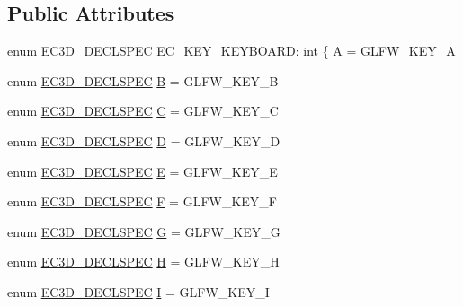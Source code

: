 \subsection*{Public Attributes}
\begin{DoxyCompactItemize}
\item 
enum \mbox{\hyperlink{_common_8h_aac42573e202ca3dd4d259c81691e2369}{E\+C3\+D\+\_\+\+D\+E\+C\+L\+S\+P\+EC}} \mbox{\hyperlink{classec_1_1_keyboard_a135ca08df15aebf8c93ce3cc76288a6e}{E\+C\+\_\+\+K\+E\+Y\+\_\+\+K\+E\+Y\+B\+O\+A\+RD}}\+: int \{ A = G\+L\+F\+W\+\_\+\+K\+E\+Y\+\_\+A
\item 
enum \mbox{\hyperlink{_common_8h_aac42573e202ca3dd4d259c81691e2369}{E\+C3\+D\+\_\+\+D\+E\+C\+L\+S\+P\+EC}} \mbox{\hyperlink{classec_1_1_keyboard_a10567c2f907d921b438ca4f96e7dfb86}{B}} = G\+L\+F\+W\+\_\+\+K\+E\+Y\+\_\+B
\item 
enum \mbox{\hyperlink{_common_8h_aac42573e202ca3dd4d259c81691e2369}{E\+C3\+D\+\_\+\+D\+E\+C\+L\+S\+P\+EC}} \mbox{\hyperlink{classec_1_1_keyboard_afdb55905c629366fca7f4b8b342d7925}{C}} = G\+L\+F\+W\+\_\+\+K\+E\+Y\+\_\+C
\item 
enum \mbox{\hyperlink{_common_8h_aac42573e202ca3dd4d259c81691e2369}{E\+C3\+D\+\_\+\+D\+E\+C\+L\+S\+P\+EC}} \mbox{\hyperlink{classec_1_1_keyboard_ab15bf9e1970fea6d05ec91687089dff1}{D}} = G\+L\+F\+W\+\_\+\+K\+E\+Y\+\_\+D
\item 
enum \mbox{\hyperlink{_common_8h_aac42573e202ca3dd4d259c81691e2369}{E\+C3\+D\+\_\+\+D\+E\+C\+L\+S\+P\+EC}} \mbox{\hyperlink{classec_1_1_keyboard_a95903eac785cffca940c056b1c7c70a3}{E}} = G\+L\+F\+W\+\_\+\+K\+E\+Y\+\_\+E
\item 
enum \mbox{\hyperlink{_common_8h_aac42573e202ca3dd4d259c81691e2369}{E\+C3\+D\+\_\+\+D\+E\+C\+L\+S\+P\+EC}} \mbox{\hyperlink{classec_1_1_keyboard_a60c5617a98a4b1ff360ccd1c4fd48251}{F}} = G\+L\+F\+W\+\_\+\+K\+E\+Y\+\_\+F
\item 
enum \mbox{\hyperlink{_common_8h_aac42573e202ca3dd4d259c81691e2369}{E\+C3\+D\+\_\+\+D\+E\+C\+L\+S\+P\+EC}} \mbox{\hyperlink{classec_1_1_keyboard_a7956c29b83bc5d7bf3b1f5f4b806fb50}{G}} = G\+L\+F\+W\+\_\+\+K\+E\+Y\+\_\+G
\item 
enum \mbox{\hyperlink{_common_8h_aac42573e202ca3dd4d259c81691e2369}{E\+C3\+D\+\_\+\+D\+E\+C\+L\+S\+P\+EC}} \mbox{\hyperlink{classec_1_1_keyboard_a58c938acd086ad64b49a1359dfb25e0b}{H}} = G\+L\+F\+W\+\_\+\+K\+E\+Y\+\_\+H
\item 
enum \mbox{\hyperlink{_common_8h_aac42573e202ca3dd4d259c81691e2369}{E\+C3\+D\+\_\+\+D\+E\+C\+L\+S\+P\+EC}} \mbox{\hyperlink{classec_1_1_keyboard_a38ffec286d89e2499ffd76a41eba6897}{I}} = G\+L\+F\+W\+\_\+\+K\+E\+Y\+\_\+I

\end{DoxyCompactItemize}
